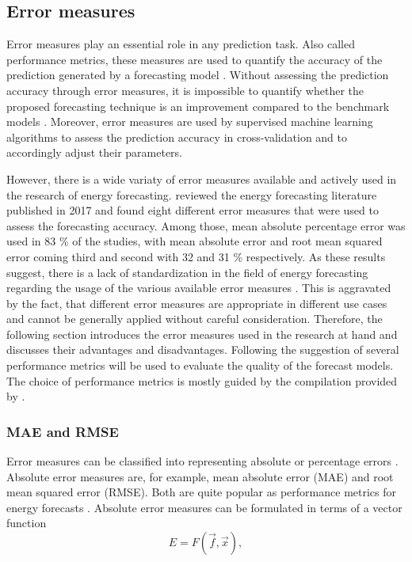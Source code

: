 \subsection{Error measures} \label{Sec:Method;Subsec:Error}

Error measures play an essential role in any prediction task. Also called performance metrics, these measures are used to quantify the accuracy of the prediction generated by a forecasting model \citep{zor:2017}. Without assessing the prediction accuracy through error measures, it is impossible to quantify whether the proposed forecasting technique is an improvement compared to the benchmark models \citep{Meer:2018}. Moreover, error measures are used by supervised machine learning algorithms to assess the prediction accuracy in cross-validation and to accordingly adjust their parameters.

However, there is a wide variaty of error measures available and actively used in the research of energy forecasting. \citet{zor:2017} reviewed the energy forecasting literature published in 2017 and found eight different error measures that were used to assess the forecasting accuracy. Among those, mean absolute percentage error was used in 83 \% of the studies, with mean absolute error and root mean squared error coming third and second with 32 and 31 \% respectively. As these results suggest, there is a lack of standardization in the field of energy forecasting regarding the usage of the various available error measures \citep{Meer:2018}. This is aggravated by the fact, that different error measures are appropriate in different use cases and cannot be generally applied without careful consideration. Therefore, the following section introduces the error measures used in the research at hand and discusses their advantages and disadvantages. Following the suggestion of \citet{Hoff:2013} several performance metrics will be used to evaluate the quality of the forecast models. The choice of performance metrics is mostly guided by the compilation provided by \citet{Meer:2018}.


\subsubsection{MAE and RMSE}

Error measures can be classified into representing absolute or percentage errors \citep{Hoff:2013}. Absolute error measures are, for example, mean absolute error (MAE) and root mean squared error (RMSE). Both are quite popular as performance metrics for energy forecasts \citep{zor:2017}. Absolute error measures can be formulated in terms of a vector function 
%
\begin{equation} \label{Eq:vectorfunction}
    E=F\left(\vec{f}, \vec{x}\right),
\end{equation}

